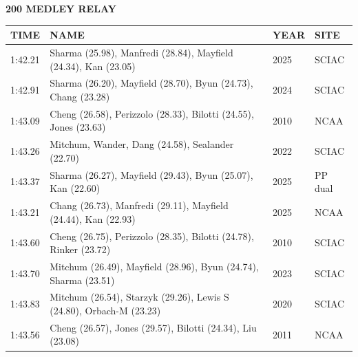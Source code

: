\begin{table}[H]
\centering
\begin{minipage}[t]{0.6\textwidth}
\centering
\textbf{200 MEDLEY RELAY}\\[0.1cm]
\begin{tabular}{@{}p{1.8cm}p{2.8cm}p{1.2cm}p{1.4cm}@{}}
\hline
    \textbf{TIME} & \textbf{NAME} & \textbf{YEAR} & \textbf{SITE} \\
\hline
    1:42.21 & Sharma (25.98), Manfredi (28.84), Mayfield (24.34), Kan (23.05) & 2025 & SCIAC \\
    1:42.91 & Sharma (26.20), Mayfield (28.70), Byun (24.73), Chang (23.28) & 2024 & SCIAC \\
    1:43.09 & Cheng (26.58), Perizzolo (28.33), Bilotti (24.55), Jones (23.63) & 2010 & NCAA \\
    1:43.26 & Mitchum, Wander, Dang (24.58), Sealander (22.70) & 2022 & SCIAC \\
    1:43.37 & Sharma (26.27), Mayfield (29.43), Byun (25.07), Kan (22.60) & 2025 & PP dual \\
    1:43.21 & Chang (26.73), Manfredi (29.11), Mayfield (24.44), Kan (22.93) & 2025 & NCAA \\
    1:43.60 & Cheng (26.75), Perizzolo (28.35), Bilotti (24.78), Rinker (23.72) & 2010 & SCIAC \\
    1:43.70 & Mitchum (26.49), Mayfield (28.96), Byun (24.74), Sharma (23.51) & 2023 & SCIAC \\
    1:43.83 & Mitchum (26.54), Starzyk (29.26), Lewis S (24.80), Orbach-M (23.23) & 2020 & SCIAC \\
    1:43.56 & Cheng (26.57), Jones (29.57), Bilotti (24.34), Liu (23.08) & 2011 & NCAA \\
\hline
\end{tabular}
\end{minipage}
\end{table}

